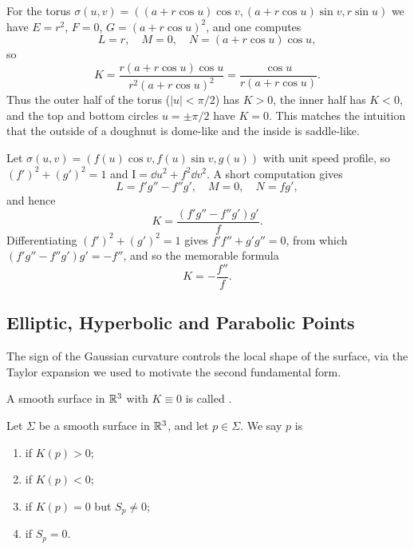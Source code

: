 \documentclass[a4paper]{scrartcl}
\begin{document}
\begin{example}
    For the torus $\sigma(u,v) = ((a+r\cos u)\cos v, (a+r\cos u)\sin v, r\sin u)$ we have $E = r^2$, $F = 0$, $G = (a+r\cos u)^2$, and one computes
    $$
    L = r, \quad M = 0, \quad N = (a+r\cos u)\cos u,
    $$
    so
    $$
    K = \frac{r(a+r\cos u)\cos u}{r^2(a+r\cos u)^2} = \frac{\cos u}{r(a + r\cos u)}.
    $$
    Thus the outer half of the torus ($|u| < \pi/2$) has $K > 0$, the inner half has $K < 0$, and the top and bottom circles $u = \pm\pi/2$ have $K = 0$. This matches the intuition that the outside of a doughnut is dome-like and the inside is saddle-like.
\end{example}

\begin{example}
    Let $\sigma(u,v) = (f(u)\cos v, f(u)\sin v, g(u))$ with unit speed profile, so $(f')^2 + (g')^2 = 1$ and $\mathrm{I} = \dd u^2 + f^2 \dd v^2$. A short computation gives
    $$
    L = f'g'' - f''g', \quad M = 0, \quad N = fg',
    $$
    and hence
    $$
    K = \frac{(f'g''-f''g')g'}{f}.
    $$
    Differentiating $(f')^2+(g')^2 = 1$ gives $f'f''+g'g'' = 0$, from which $(f'g''-f''g')g' = -f''$, and so the memorable formula
    $$
    K = -\frac{f''}{f}.
    $$
\end{example}

\subsection{Elliptic, Hyperbolic and Parabolic Points}

The sign of the Gaussian curvature controls the local shape of the surface, via the Taylor expansion we used to motivate the second fundamental form.

\begin{definition}
    A smooth surface in $\mathbb{R}^3$ with $K \equiv 0$ is called .
\end{definition}

\begin{definition}
    Let $\Sigma$ be a smooth surface in $\mathbb{R}^3$, and let $p \in \Sigma$. We say $p$ is
    \begin{enumerate}[label=(\roman*)]
        \item {} if $K(p) > 0$;
        \item {} if $K(p) < 0$;
        \item {} if $K(p) = 0$ but $S_p \neq 0$;
        \item {} if $S_p = 0$.
    \end{enumerate}
\end{definition}
\end{document}
